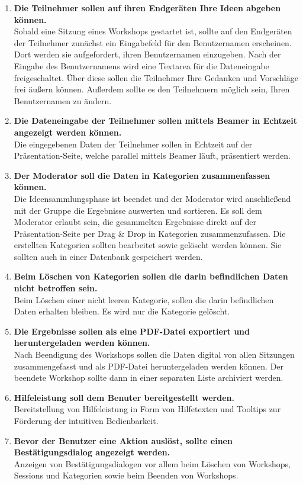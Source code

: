 \begin{enumerate}
Zu Beginn des Workshops sollte ein QR\footnote{englisch: Quick Response}-Code mittels Beamer angezeigt werden, sodass die anwesenden Teilnehmer diesen mit ihren Mobilgeräten einscannen und an diesem Workshop mitwirken können. Der Moderator sollte auch die Möglichkeit haben, auch während einer Sitzung den QR-Code einblenden zu können. Die Einladung zur Teilnahme am Workshop sollte ebenfalls auch per Mail gesendet werden können.
\item \textbf{Die Teilnehmer sollen auf ihren Endgeräten Ihre Ideen abgeben können.}\\
Sobald eine Sitzung eines Workshops gestartet ist, sollte auf den Endgeräten der Teilnehmer zunächst ein Eingabefeld für den Benutzernamen erscheinen. Dort werden sie aufgefordert, ihren Benutzernamen einzugeben. Nach der Eingabe des Benutzernamens wird eine Textarea für die Dateneingabe freigeschaltet. Über diese sollen die Teilnehmer Ihre Gedanken und Vorschläge frei äußern können. Außerdem sollte es den Teilnehmern möglich sein, Ihren Benutzernamen zu ändern.
\item \textbf{Die Dateneingabe der Teilnehmer sollen mittels Beamer in Echtzeit angezeigt werden können.} \\
Die eingegebenen Daten der Teilnehmer sollen in Echtzeit auf der Präsentation-Seite, welche parallel mittels Beamer läuft, präsentiert werden.
\item \textbf{Der Moderator soll die Daten in Kategorien zusammenfassen können.}\\
Die Ideensammlungsphase ist beendet und der Moderator wird anschließend mit der Gruppe die Ergebnisse auswerten und sortieren. Es soll dem Moderator erlaubt sein, die gesammelten Ergebnisse direkt auf der Präsentation-Seite per Drag \& Drop in Kategorien zusammenzufassen. Die erstellten Kategorien sollten bearbeitet sowie gelöscht werden können. Sie sollten auch in einer Datenbank gespeichert werden.
\item \textbf{Beim Löschen von Kategorien sollen die darin befindlichen Daten nicht betroffen sein.}\\
Beim Löschen einer nicht leeren Kategorie, sollen die darin befindlichen Daten erhalten bleiben. Es wird nur die Kategorie gelöscht.
\item \textbf{Die Ergebnisse sollen als eine PDF-Datei exportiert und heruntergeladen werden können.}\\
Nach Beendigung des Workshops sollen die Daten digital von allen Sitzungen zusammengefasst und als PDF-Datei heruntergeladen werden können. Der beendete Workshop sollte dann in einer separaten Liste archiviert werden.
\item \textbf{Hilfeleistung soll dem Benuter bereitgestellt werden.}\\
Bereitstellung von Hilfeleistung in Form von Hilfetexten und Tooltips zur Förderung der intuitiven Bedienbarkeit.
\item \textbf{Bevor der Benutzer eine Aktion auslöst, sollte einen Bestätigungsdialog angezeigt werden.}\\
Anzeigen von Bestätigungsdialogen vor allem beim Löschen von Workshops, Sessions und Kategorien sowie beim Beenden von Workshops.
\end{enumerate}

